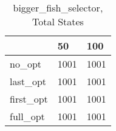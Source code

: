 \begin{table}
\caption{bigger\_fish\_selector, Total States}
\label{bigger_fish_selector_total}
\begin{tabular}{lll}
\toprule
 & 50 & 100 \\
\midrule
no\_opt & 1001 & 1001 \\
last\_opt & 1001 & 1001 \\
first\_opt & 1001 & 1001 \\
full\_opt & 1001 & 1001 \\
\bottomrule
\end{tabular}
\end{table}
